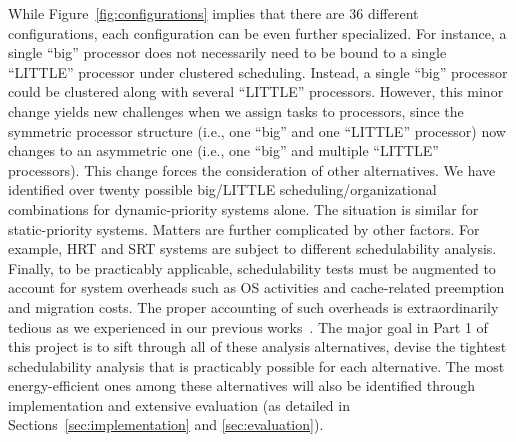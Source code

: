  

While  Figure~\ref{fig:configurations} implies that there are 36 different configurations, each configuration can be even further specialized. For instance, a single ``big'' processor does not necessarily need to be bound to a single ``LITTLE'' processor under clustered scheduling. Instead, a single ``big'' processor could be clustered along with several ``LITTLE'' processors. However, this minor change yields new challenges when we assign tasks to processors, since the symmetric processor structure (i.e., one ``big'' and one ``LITTLE'' processor) now changes to an asymmetric one (i.e., one ``big'' and multiple ``LITTLE'' processors). This change forces the consideration of other alternatives. We have identified over twenty possible big/LITTLE scheduling/organizational combinations for dynamic-priority systems alone. The situation is similar for static-priority systems. Matters are further complicated by other factors. For example, HRT and SRT systems are subject to different schedulability analysis. Finally, to be practicably applicable, schedulability tests must be augmented to account for system overheads such as OS activities and cache-related preemption and migration costs. %
 The proper accounting of such overheads is extraordinarily tedious as we experienced in our previous works~\cite{?}. The major goal in Part 1 of this project is to sift through all of these analysis alternatives, devise the tightest schedulability analysis that is practicably possible for each alternative. The most energy-efficient ones among these alternatives will also be identified through implementation and extensive evaluation (as detailed in Sections~\ref{sec:implementation} and \ref{sec:evaluation}). 


